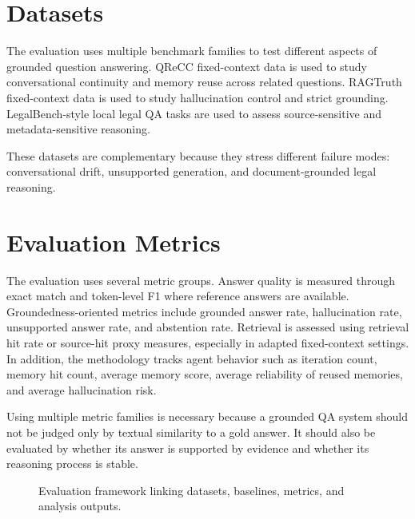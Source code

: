 \section{Datasets}
\label{sec:datasets}

The evaluation uses multiple benchmark families to test different aspects of grounded question answering. QReCC fixed-context data is used to study conversational continuity and memory reuse across related questions. RAGTruth fixed-context data is used to study hallucination control and strict grounding. LegalBench-style local legal QA tasks are used to assess source-sensitive and metadata-sensitive reasoning.

These datasets are complementary because they stress different failure modes: conversational drift, unsupported generation, and document-grounded legal reasoning.


\section{Evaluation Metrics}
\label{sec:evaluation-metrics}

The evaluation uses several metric groups. Answer quality is measured through exact match and token-level F1 where reference answers are available. Groundedness-oriented metrics include grounded answer rate, hallucination rate, unsupported answer rate, and abstention rate. Retrieval is assessed using retrieval hit rate or source-hit proxy measures, especially in adapted fixed-context settings. In addition, the methodology tracks agent behavior such as iteration count, memory hit count, average memory score, average reliability of reused memories, and average hallucination risk.

Using multiple metric families is necessary because a grounded QA system should not be judged only by textual similarity to a gold answer. It should also be evaluated by whether its answer is supported by evidence and whether its reasoning process is stable.

\begin{figure}[H]
    \centering
    
    \caption{Evaluation framework linking datasets, baselines, metrics, and analysis outputs.}
    \label{fig:evaluation-framework}
\end{figure}

